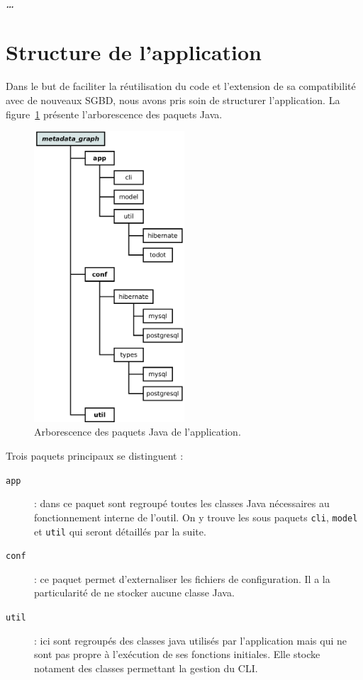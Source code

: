 \subparagraph{\ldots}

\section{Structure de l'application}
\label{section:structure_de_lapplication}

Dans le but de faciliter la réutilisation du code et l'extension de sa compatibilité avec de nouveaux SGBD, nous avons pris soin de structurer l'application. La figure~\ref{figure:structure_appli} présente l'arborescence des paquets Java.

\begin{figure}[H]
\centering
\includegraphics[width=0.5\textwidth]{files/archi}
\caption{Arborescence des paquets Java de l'application.}
\label{figure:structure_appli}
\end{figure}

Trois paquets principaux se distinguent :

\begin{description}
\item[\texttt{app}] : dans ce paquet sont regroupé toutes les classes Java nécessaires au fonctionnement interne de l'outil. On y trouve les sous paquets \texttt{cli}, \texttt{model} et \texttt{util} qui seront détaillés par la suite.
\item[\texttt{conf}] : ce paquet permet d'externaliser les fichiers de configuration. Il a la particularité de ne stocker aucune classe Java.
\item[\texttt{util}] : ici sont regroupés des classes java utilisés par l'application mais qui ne sont pas propre à l’exécution de ses fonctions initiales. Elle stocke notament des classes permettant la gestion du CLI.
\end{description}

